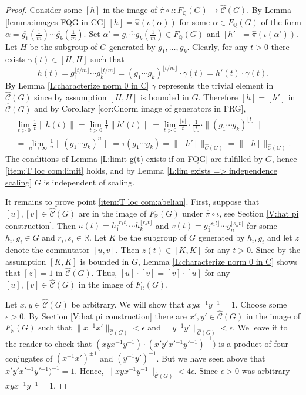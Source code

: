 \documentclass[12pt]{amsart}
\theoremstyle{definition}
\def\QQ{\ensuremath{\mathbb{Q}}}
\def\RR{\ensuremath{\mathbb{R}}}
\def\Free{F}
\def\tC{\hat{\mathcal{C}}}
\newcommand{\Myfloor}[1]{\lfloor #1 \rfloor}
\begin{document}
\begin{proof}
Consider some $[h]$ in the image of $\hat{\pi} \circ \iota \colon \Free_\QQ(G) \to \tC(G)$.
By Lemma \ref{lemma:images FQG in CG} $[h]=\hat{\pi}(\iota(\alpha))$ for some $\alpha \in \Free_\QQ(G)$ of the form $\alpha=\overline{g_1}(\tfrac{1}{m}) \cdots \overline{g_k}(\tfrac{1}{m})$.
Set $\alpha'=\overline{g_1 \cdots g_k}(\tfrac{1}{m}) \in \Free_\QQ(G)$ and $[h']=\hat{\pi}(\iota(\alpha'))$.
Let $H$ be the subgroup of $G$ generated by $g_1,\dots,g_k$.
Clearly, for any $t>0$ there exists $\gamma(t) \in [H,H]$ such that
\[
h(t) = g_1^{\Myfloor{t/m}} \cdots g_k^{\Myfloor{t/m}} = (g_1 \cdots g_k)^{\Myfloor{t/m}} \cdot \gamma(t) = h'(t) \cdot \gamma(t).
\]
By Lemma \ref{L:characterize norm 0 in C}  $\gamma$ represents the trivial element in $\tC(G)$ since by assumption $[H,H]$ is bounded in $G$.
Therefore $[h]=[h']$ in $\tC(G)$ and by Corollary \ref{cor:Cnorm image of generators in FRG}, %
\begin{multline*}
\lim_{t>0} \tfrac{1}{t} \|h(t)\| 
=
\lim_{t>0} \tfrac{1}{t} \|h'(t)\| 
=
\lim_{t>0} \tfrac{\Myfloor{t}}{t} \cdot \tfrac{1}{\Myfloor{t}} \cdot \|(g_1 \cdots g_k)^{\Myfloor{t}}\| 
\\
=
\lim_{n \to \infty} \tfrac{1}{n} \|(g_1 \cdots g_k)^n\| 
=
\tau(g_1\cdots g_k)
=
\| [h']\|_{\tC(G)}
=
\| [h]\|_{\tC(G)}.
\end{multline*}
The conditions of Lemma \ref{L:limit g(t) exists if on FQG} are fulfilled by $G$, hence \ref{item:T loc com:limit} holds, and by Lemma \ref{L:lim exists => independence scaling} $G$ is independent of scaling.

It remains to prove point \ref{item:T loc com:abelian}.
First, suppose that $[u],[v] \in \tC(G)$ are in the image of $\Free_\RR(G)$ under $\hat{\pi} \circ \iota$, see Section \ref{V:hat pi construction}.
Then $u(t)=h_1^{\Myfloor{r_1t}}\cdots h_k^{\Myfloor{r_kt}}$ and $v(t)=g_1^{\Myfloor{s_1t}}\cdots g_n^{\Myfloor{s_nt}}$ for some $h_i,g_i \in G$ and $r_i,s_i \in \RR$.
Let $K$ be the subgroup of $G$ generated by $h_i, g_i$ and let $z$ denote the commutator $[u,v]$.
Then $z(t) \in [K,K]$ for any $t>0$.
Since by the assumption $[K,K]$ is bounded in $G$, Lemma \ref{L:characterize norm 0 in C} shows that $[z]=1$ in $\tC(G)$.
Thus, $[u]\cdot [v] = [v] \cdot [u]$ for any $[u],[v] \in \tC(G)$ in the image of $\Free_\RR(G)$.

Let $x,y \in \tC(G)$ be arbitrary.
We will show that $xyx^{-1}y^{-1}=1$.
Choose some $\epsilon>0$.
By Section \ref{V:hat pi construction} there are $x',y' \in \tC(G)$ in the image of $\Free_\RR(G)$ such that $\|x^{-1}x'\|_{\tC(G)} < \epsilon$ and $\|y^{-1}y'\|_{\tC(G)}<\epsilon$.
We leave it to the reader to check that $(xyx^{-1}y^{-1})\cdot(x'y'x'{}^{-1}y'{}^{-1})^{-1})$ is a product of four conjugates of $(x^{-1}x')^{\pm 1}$ and $(y^{-1}y')^{-1}$.
But we have seen above that $x'y'x'{}^{-1}y'{}^{-1})^{-1}=1$.
Hence, $\| xyx^{-1}y^{-1}\|_{\tC(G)} < 4\epsilon$.
Since $\epsilon>0$ was arbitrary $xyx^{-1}y^{-1}=1$.
\end{proof}
\end{document}
